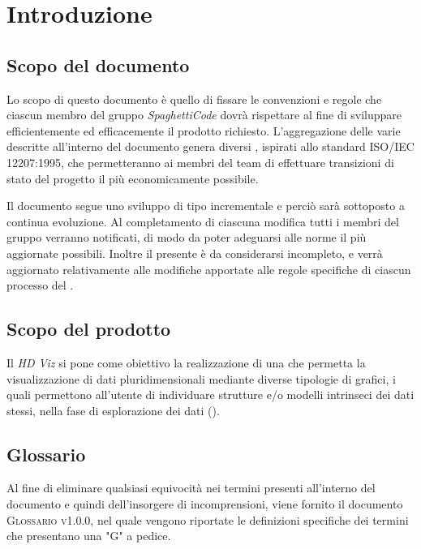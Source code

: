 \section{Introduzione}
\label{sec:introduzione}

\subsection{Scopo del documento}
Lo scopo di questo documento è quello di fissare le convenzioni e regole che ciascun membro del gruppo 
\emph{SpaghettiCode} dovrà rispettare al fine di sviluppare efficientemente ed efficacemente il prodotto richiesto. %
L'aggregazione delle varie  descritte all'interno del documento genera diversi 
, ispirati allo standard \textsc{ISO/IEC 12207:1995}, che permetteranno ai membri del team di effettuare transizioni di stato del progetto il più economicamente possibile. 

Il documento segue uno sviluppo di tipo incrementale e perciò sarà sottoposto a continua evoluzione. Al completamento di 
ciascuna modifica tutti i membri del gruppo verranno notificati, di modo da poter adeguarsi alle norme il più aggiornate 
possibili.
Inoltre il presente è da considerarsi incompleto, e verrà aggiornato relativamente alle modifiche apportate alle regole 
specifiche di ciascun processo del .

\subsection{Scopo del prodotto}
Il  \emph{HD Viz} si pone come obiettivo la realizzazione di una  che 
permetta la visualizzazione di dati pluridimensionali mediante diverse tipologie di grafici, i quali permettono 
all'utente di individuare strutture e/o modelli intrinseci dei dati stessi, nella fase di esplorazione dei dati 
().

\subsection{Glossario}
Al fine di eliminare qualsiasi equivocità nei termini presenti all'interno del documento e quindi dell'insorgere di 
incomprensioni, viene fornito il documento \textsc{Glossario v1.0.0}, nel quale vengono riportate le definizioni 
specifiche dei termini che presentano una "G" a pedice.

